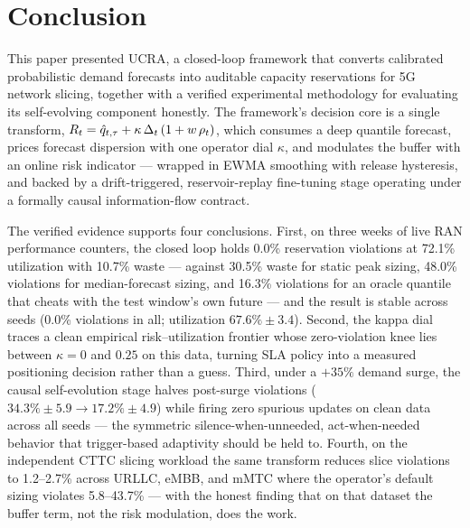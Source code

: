 \section{Conclusion}
\label{sec:conclusion}

This paper presented UCRA, a closed-loop framework that converts
calibrated probabilistic demand forecasts into auditable capacity
reservations for 5G network slicing, together with a verified
experimental methodology for evaluating its self-evolving component
honestly. The framework's decision core is a single transform,
$R_t = \hat{q}_{t,\tau} + \kappa\,\Delta_t\,(1 + w\,\rho_t)$, which consumes a
deep quantile forecast, prices forecast dispersion with one operator
dial $\kappa$, and modulates the buffer with an online risk indicator
--- wrapped in EWMA smoothing with release hysteresis, and backed by
a drift-triggered, reservoir-replay fine-tuning stage operating under
a formally causal information-flow contract.

The verified evidence supports four conclusions. First, on three
weeks of live RAN performance counters, the closed loop holds 0.0\%
reservation violations at 72.1\% utilization with 10.7\% waste ---
against 30.5\% waste for static peak sizing, 48.0\% violations for
median-forecast sizing, and 16.3\% violations for an oracle quantile
that cheats with the test window's own future --- and the result is
stable across seeds (0.0\% violations in all; utilization
$67.6\% \pm 3.4$). Second, the kappa dial traces a clean empirical
risk--utilization frontier whose zero-violation knee lies between
$\kappa = 0$ and $0.25$ on this data, turning SLA policy into a
measured positioning decision rather than a guess. Third, under a
$+35\%$ demand surge, the causal self-evolution stage halves
post-surge violations ($34.3\% \pm 5.9 \rightarrow 17.2\% \pm 4.9$)
while firing zero spurious updates on clean data across all seeds
--- the symmetric silence-when-unneeded, act-when-needed behavior
that trigger-based adaptivity should be held to. Fourth, on the
independent CTTC slicing workload the same transform reduces slice
violations to 1.2--2.7\% across URLLC, eMBB, and mMTC where the
operator's default sizing violates 5.8--43.7\% --- with the honest
finding that on that dataset the buffer term, not the risk
modulation, does the work.

